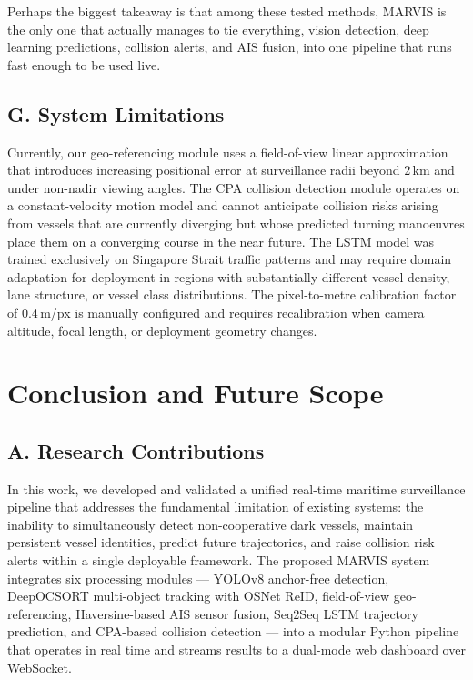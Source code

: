 \documentclass{ieeeaccess}
\begin{document}
Perhaps the biggest takeaway is that among these tested methods, MARVIS is the only one that actually manages to tie everything, vision detection, deep learning predictions, collision alerts, and AIS fusion, into one pipeline that runs fast enough to be used live.

\subsection*{G. System Limitations}

Currently, our geo-referencing module uses a field-of-view linear 
approximation that introduces increasing positional error at 
surveillance radii beyond 2\,km and under non-nadir viewing 
angles. The CPA collision detection module operates on a 
constant-velocity motion model and cannot anticipate collision 
risks arising from vessels that are currently diverging but 
whose predicted turning manoeuvres place them on a converging 
course in the near future. The LSTM model was trained 
exclusively on Singapore Strait traffic patterns and may 
require domain adaptation for deployment in regions with 
substantially different vessel density, lane structure, or 
vessel class distributions. The pixel-to-metre calibration 
factor of 0.4\,m/px is manually configured and requires 
recalibration when camera altitude, focal length, or 
deployment geometry changes.



\section{Conclusion and Future Scope}
\label{sec:conclusion}

\subsection*{A. Research Contributions}

In this work, we developed and validated a unified real-time maritime 
surveillance pipeline that addresses the fundamental limitation of 
existing systems: the inability to simultaneously detect 
non-cooperative dark vessels, maintain persistent vessel identities, 
predict future trajectories, and raise collision risk alerts within 
a single deployable framework. The proposed MARVIS system integrates 
six processing modules --- YOLOv8 anchor-free detection, DeepOCSORT 
multi-object tracking with OSNet ReID, field-of-view geo-referencing, 
Haversine-based AIS sensor fusion, Seq2Seq LSTM trajectory prediction, 
and CPA-based collision detection --- into a modular Python pipeline 
that operates in real time and streams results to a dual-mode web 
dashboard over WebSocket.
\end{document}

